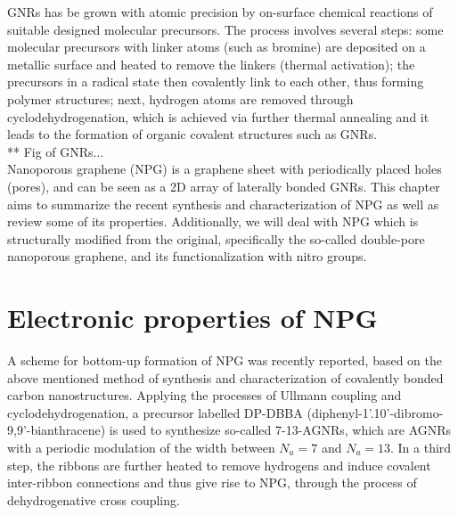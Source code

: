 GNRs has be grown with atomic precision by on-surface chemical reactions of suitable
designed molecular precursors\parencite{Cai2010, Kretz2018}. The process involves several steps\parencite{Grill2007, Cai2010}: some molecular precursors with linker atoms (such as bromine) are deposited on a metallic surface and  heated to remove the linkers (thermal activation); the precursors in a radical state then covalently link to each other, thus forming polymer structures; next, hydrogen atoms are removed through cyclodehydrogenation, which is achieved via further thermal annealing and it leads to the formation of organic covalent structures such as GNRs.\\

** Fig of GNRs...\\

Nanoporous graphene (NPG) is a graphene sheet with periodically placed holes (pores), and can be seen as a 2D array of laterally bonded GNRs. This chapter aims to summarize the recent synthesis and characterization\parencite{Moreno2018} of NPG as well as review some of its properties. Additionally, we will deal with NPG which is structurally modified from the original, specifically the so-called double-pore nanoporous graphene, and its functionalization with nitro groups.


\section{Electronic properties of NPG}

A scheme for bottom-up formation of NPG was recently reported\parencite{Moreno2018, Kretz2018}, based on the above mentioned method of synthesis and characterization of covalently bonded carbon nanostructures.
Applying the processes of Ullmann coupling and cyclodehydrogenation, a precursor labelled DP-DBBA (diphenyl-1'.10'-dibromo-9,9'-bianthracene) is used to synthesize so-called 7-13-AGNRs, which are AGNRs with a periodic modulation of the width between \(N_a=7\) and \(N_a=13\). In a third step, the ribbons are further heated to remove hydrogens and induce covalent inter-ribbon connections and thus give rise to NPG, through the process of dehydrogenative cross coupling.\\

